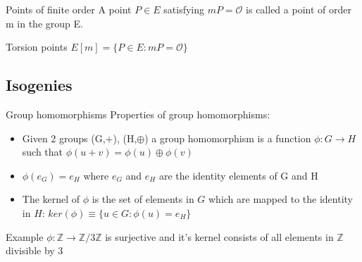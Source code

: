 \documentclass{beamer}
\begin{document}
\begin{frame}{Points of finite order}
A point $P\in E$ satisfying $mP=\mathcal{O}$ is called a point of order m in the group E.

\begin{block}{Torsion points}
	$E[m] = \{P\in E: mP = \mathcal{O}\}$
\end{block}
\end{frame}

\subsection{Isogenies}
\begin{frame}{Group homomorphisms}
Properties of group homomorphisms:
\begin{itemize}
	\item Given 2 groups (G,+), (H,$\oplus$) a group homomorphism is a function $\phi: G \to H$ such that $\phi(u + v) = \phi(u) \oplus \phi(v)$ 
	\item $\phi(e_G) = e_H$ where $e_G$ and $e_H$ are the identity elements of G and H
	\item The kernel of $\phi$ is the set of elements in $G$ which are mapped to the identity in $H$:
	$ker(\phi) \equiv \{u\in G:\phi(u)=e_H\}$
\end{itemize}
	 
	
	\begin{block}{Example}
		$\phi: \mathbb{Z}\to\mathbb{Z}/3\mathbb{Z}$ is surjective and it's kernel consists of all elements in $\mathbb{Z}$ divisible by 3
		
		
	\end{block}
\end{frame}
\end{document}
